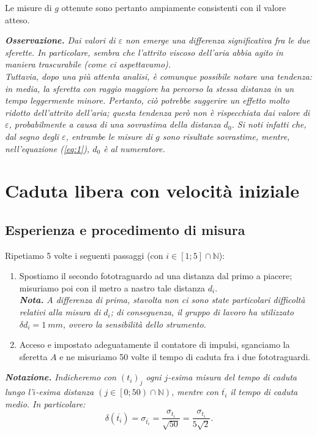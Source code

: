 \documentclass{article}
\begin{document}
Le misure di $g$ ottenute sono pertanto ampiamente consistenti con il valore atteso.

\emph{
    \textbf{Osservazione.} Dai valori di $\varepsilon$ non emerge una differenza
    significativa fra le due sferette. In particolare, sembra che l'attrito viscoso
    dell'aria abbia agito in maniera trascurabile (come ci aspettavamo).\\
    Tuttavia, dopo una più attenta analisi, è comunque possibile notare una tendenza:
    in media, la sferetta con raggio maggiore ha percorso la stessa distanza in un
    tempo leggermente minore.
    Pertanto, ciò potrebbe suggerire un effetto molto ridotto dell'attrito dell'aria;
    questa tendenza però non è rispecchiata dai valore di $\varepsilon$,
    probabilmente a causa di una sovrastima della distanza $d_0$. Si noti infatti che,
    dal segno degli $\varepsilon$, entrambe le misure di $g$ sono risultate sovrastime,
    mentre, nell'equazione (\ref{eq:1}), $d_0$ è al numeratore.
}

\section{Caduta libera con velocità iniziale}
\subsection{Esperienza e procedimento di misura}
Ripetiamo 5 volte i seguenti passaggi (con $i\in\left[1;5\right]\cap\mathbb{N}$):
\begin{enumerate}
    \item
        Spostiamo il secondo fototraguardo ad una distanza dal primo a piacere;
        misuriamo poi con il metro a nastro tale distanza $d_i$.\\
        \emph{
            \textbf{Nota.} A differenza di prima, stavolta non ci sono state
            particolari difficoltà relativi alla misura di $d_i$; di conseguenza,
            il gruppo di lavoro ha utilizzato $\delta d_i = \qty{1}{mm}$, ovvero
            la sensibilità dello strumento.
        }
    \item
        Acceso e impostato adeguatamente il contatore di impulsi, sganciamo la
        sferetta $A$ e ne misuriamo 50 volte il tempo di caduta fra i due
        fototraguardi.
\end{enumerate}

\emph{
    \textbf{Notazione.} Indicheremo con $\left(t_i\right)_j$
    ogni $j$-esima misura del tempo di caduta lungo l'$i$-esima distanza
    $\left(j\in\left[0;50\right)\cap\mathbb{N}\right)$,
    mentre con $\overline{t_i}$ il tempo di caduta medio.
    In particolare:\[
        \delta\!\left(\overline{t_i}\right) = \sigma_{\overline{t_i}} =
        \frac{\sigma_{t_i}}{\sqrt{50}} = \frac{\sigma_{t_i}}{5\sqrt{2}}.
    \]
}
\end{document}
